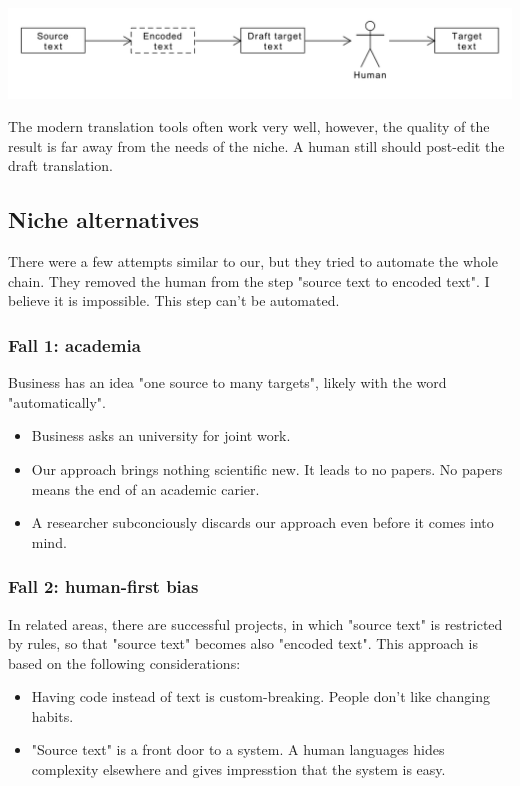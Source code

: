 \documentclass{article}
\begin{document}
\includegraphics[scale=0.4]{dia/how-current-world.pdf}

The modern translation tools often work very well, however, the quality of the result is far away from the needs of the niche. A human still should post-edit the draft translation.

\subsection{Niche alternatives}

There were a few attempts similar to our, but they tried to automate the whole chain. They removed the human from the step "source text to encoded text". I believe it is impossible. This step can't be automated.

\subsubsection{Fall 1: academia}

Business has an idea "one source to many targets", likely with the word "automatically".
\begin{itemize}
\item Business asks an university for joint work.
\item Our approach brings nothing scientific new. It leads to no papers. No papers means the end of an academic carier.
\item A researcher subconciously discards our approach even before it comes into mind.
\end{itemize}

\subsubsection{Fall 2: human-first bias}

In related areas, there are successful projects, in which "source text" is restricted by rules, so that "source text" becomes also "encoded text". This approach is based on the following considerations:

\begin{itemize}
\item Having code instead of text is custom-breaking. People don't like changing habits.
\item "Source text" is a front door to a system. A human languages hides complexity elsewhere and gives impresstion that the system is easy.
\end{itemize}
\end{document}
